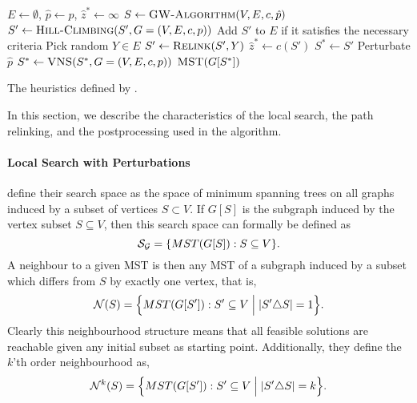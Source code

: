  \begin{algorithm}[h!]
   \begin{algorithmic}[1]
     \State $E \gets \emptyset$, $\hat{p} \gets p$, $\hat{z}^* \gets \infty$
     \State $S \gets \Call{GW-Algorithm}{V,E, c, \hat{p}}$ \label{alg:canuto:line:gw}
     \State $S' \gets \Call{Hill-Climbing}{S', G = (V, E, c, p)}$ \label{alg:canuto:line:hc}
     \State Add $S'$ to $E$ if it satisfies the necessary criteria \label{alg:canuto:line:elite}
     \State Pick random $Y \in E$
     \State $S' \gets \Call{Relink}{S', Y}$ \label{alg:canuto:line:relink}
     \State $\hat{z}^* \gets c(S')$
     \State $S^* \gets S'$
     \EndIf
     \EndIf
     \State Perturbate $\hat{p}$
     \EndFor
     \State $S^* \gets \Call{VNS}{S^*, G = (V, E, c, p)}$\label{alg:canuto:line:vns}
     \State \Return $\Call{MST}{G[S^*]}$
     \EndProcedure
 \end{algorithmic}
 \caption{The heuristics defined by \citet{canuto2001local}.}\label{alg:heuristic:canuto}
 \end{algorithm}

 In this section, we
 describe the characteristics of the local search, the
 path relinking, and the postprocessing used in the algorithm.
\paragraph{Local Search with Perturbations}
\citet{canuto2001local} define their search space as the space of minimum spanning
trees on all graphs induced by a subset of vertices
 $S \subset V$. If $G[S]$ is the subgraph induced by the vertex subset $S \subseteq V$, then
 this search space can formally be defined as
\[\mathcal{S_G} = \{MST(G[S]) : S \subseteq V \}\mathnormal{.}\]
A neighbour to a given MST is then any MST of a subgraph induced by a subset which differs from $S$
 by exactly one vertex, that is,
\[\mathcal{N}(S) = \Big\{MST(G[S']) : S' \subseteq V \Bigm| |S' \triangle S| = 1 \Big\}\mathnormal{.}\] 
Clearly this neighbourhood structure means that all feasible solutions are reachable
given any initial subset as starting point. Additionally, they define the
$k$'th order neighbourhood as,
\[\mathcal{N}^k(S) = \Big\{MST(G[S']) : S' \subseteq V \Bigm| |S' \triangle S| = k \Big\}\mathnormal{.}\] 

